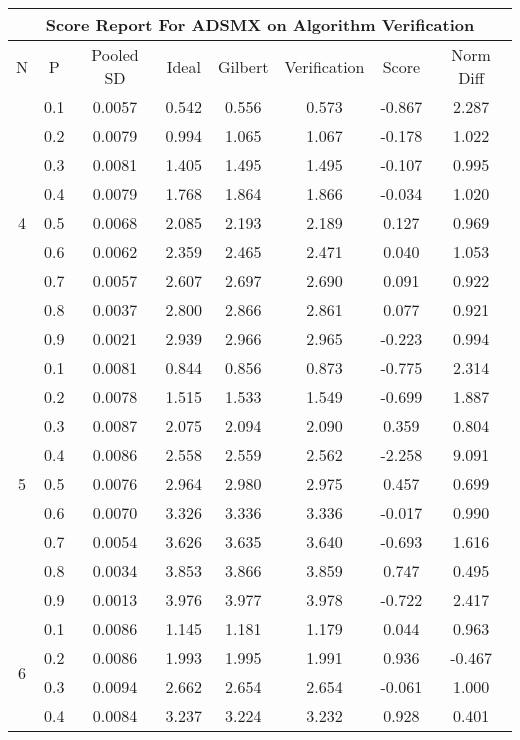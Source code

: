 \documentclass[11pt,a4paper]{report}
\begin{document}
\begin{longtable}{ | c | c || c | c | c | c | c | c | }
\hline
\multicolumn{8}{|c|}{ Score Report For ADSMX on Algorithm Verification} \\
\hline
N & P & Pooled SD &  Ideal &  Gilbert & Verification  & Score & Norm Diff \\
 \hline
 \hline
 \endhead
\multirow{9}{*}{4} & 0.1 & 0.0057 & 0.542 & 0.556 & 0.573 & -0.867 & 2.287 \\
 & 0.2 & 0.0079 & 0.994 & 1.065 & 1.067 & -0.178 & 1.022 \\
 & 0.3 & 0.0081 & 1.405 & 1.495 & 1.495 & -0.107 & 0.995 \\
 & 0.4 & 0.0079 & 1.768 & 1.864 & 1.866 & -0.034 & 1.020 \\
 & 0.5 & 0.0068 & 2.085 & 2.193 & 2.189 & 0.127 & 0.969 \\
 & 0.6 & 0.0062 & 2.359 & 2.465 & 2.471 & 0.040 & 1.053 \\
 & 0.7 & 0.0057 & 2.607 & 2.697 & 2.690 & 0.091 & 0.922 \\
 & 0.8 & 0.0037 & 2.800 & 2.866 & 2.861 & 0.077 & 0.921 \\
 & 0.9 & 0.0021 & 2.939 & 2.966 & 2.965 & -0.223 & 0.994 \\
 \hline
\multirow{9}{*}{5} & 0.1 & 0.0081 & 0.844 & 0.856 & 0.873 & -0.775 & 2.314 \\
 & 0.2 & 0.0078 & 1.515 & 1.533 & 1.549 & -0.699 & 1.887 \\
 & 0.3 & 0.0087 & 2.075 & 2.094 & 2.090 & 0.359 & 0.804 \\
 & 0.4 & 0.0086 & 2.558 & 2.559 & 2.562 & -2.258 & 9.091 \\
 & 0.5 & 0.0076 & 2.964 & 2.980 & 2.975 & 0.457 & 0.699 \\
 & 0.6 & 0.0070 & 3.326 & 3.336 & 3.336 & -0.017 & 0.990 \\
 & 0.7 & 0.0054 & 3.626 & 3.635 & 3.640 & -0.693 & 1.616 \\
 & 0.8 & 0.0034 & 3.853 & 3.866 & 3.859 & 0.747 & 0.495 \\
 & 0.9 & 0.0013 & 3.976 & 3.977 & 3.978 & -0.722 & 2.417 \\
 \hline
\multirow{9}{*}{6} & 0.1 & 0.0086 & 1.145 & 1.181 & 1.179 & 0.044 & 0.963 \\
 & 0.2 & 0.0086 & 1.993 & 1.995 & 1.991 & 0.936 & -0.467 \\
 & 0.3 & 0.0094 & 2.662 & 2.654 & 2.654 & -0.061 & 1.000 \\
 & 0.4 & 0.0084 & 3.237 & 3.224 & 3.232 & 0.928 & 0.401 \\

\end{longtable}
\end{document}
